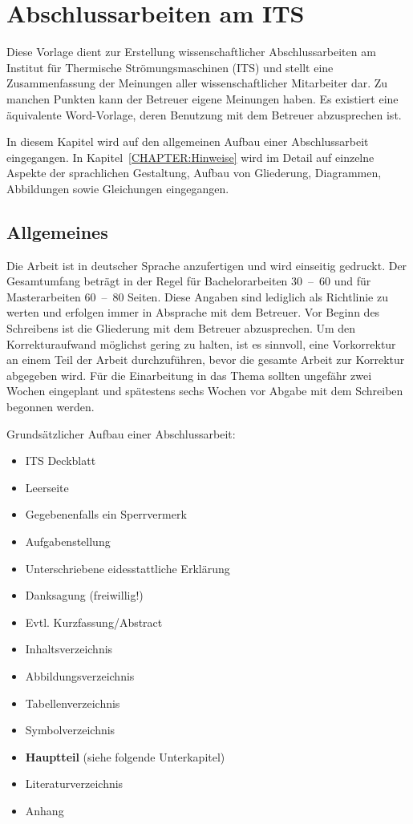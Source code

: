 \cleardoublepage

\chapter{Abschlussarbeiten am ITS}
\label{Chapter:Aufbau der Arbeit}

Diese Vorlage dient zur Erstellung wissenschaftlicher Abschlussarbeiten am Institut für Thermische Strömungsmaschinen (ITS) und stellt eine Zusammenfassung der Meinungen aller wissenschaftlicher Mitarbeiter dar. Zu manchen Punkten kann der Betreuer eigene Meinungen haben. Es existiert eine äquivalente Word-Vorlage, deren Benutzung mit dem Betreuer abzusprechen ist. 

In diesem Kapitel wird auf den allgemeinen Aufbau einer Abschlussarbeit eingegangen. In Kapitel~\ref{CHAPTER:Hinweise} wird im Detail auf einzelne Aspekte der sprachlichen Gestaltung, Aufbau von Gliederung, Diagrammen, Abbildungen sowie Gleichungen eingegangen.

\section{Allgemeines}
Die Arbeit ist in deutscher Sprache anzufertigen und wird einseitig gedruckt. Der Gesamtumfang beträgt in der Regel für Bachelorarbeiten 30~--~60 und für Masterarbeiten 60~--~80 Seiten. Diese Angaben sind lediglich als Richtlinie zu werten und erfolgen immer in Absprache mit dem Betreuer. Vor Beginn des Schreibens ist die Gliederung mit dem Betreuer abzusprechen. Um den Korrekturaufwand möglichst gering zu halten, ist es sinnvoll, eine Vorkorrektur an einem Teil der Arbeit durchzuführen, bevor die gesamte Arbeit zur Korrektur abgegeben wird. Für die Einarbeitung in das Thema sollten ungefähr zwei Wochen eingeplant und spätestens sechs Wochen vor Abgabe mit dem Schreiben begonnen werden.

Grundsätzlicher Aufbau einer Abschlussarbeit:
\begin{itemize}
\itemsep0em 
	\item ITS Deckblatt
	\item Leerseite
	\item Gegebenenfalls ein Sperrvermerk
	\item Aufgabenstellung
	\item Unterschriebene eidesstattliche Erklärung
	\item Danksagung (freiwillig!)
	\item Evtl. Kurzfassung/Abstract
	\item Inhaltsverzeichnis
	\item Abbildungsverzeichnis
	\item Tabellenverzeichnis
	\item Symbolverzeichnis
	\item \textbf{Hauptteil} (siehe folgende Unterkapitel)
	\item Literaturverzeichnis
	\item Anhang
\end{itemize}

